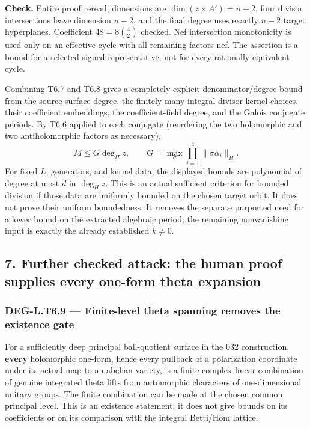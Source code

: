 \textbf{Check.} Entire proof reread; dimensions are \(\dim(z\times A')=n+2\), four divisor intersections leave dimension \(n-2\), and the final degree uses exactly \(n-2\) target hyperplanes. Coefficient \(48=8\binom42\) checked. Nef intersection monotonicity is used only on an effective cycle with all remaining factors nef. The assertion is a bound for a selected signed representative, not for every rationally equivalent cycle.

Combining T6.7 and T6.8 gives a completely explicit denominator/degree bound from the source surface degree, the finitely many integral divisor-kernel choices, their coefficient embeddings, the coefficient-field degree, and the Galois conjugate periods. By T6.6 applied to each conjugate (reordering the two holomorphic and two antiholomorphic factors as necessary), \[
M\le G\deg_H z,\qquad
G=\max_\sigma\prod_{i=1}^4\|\sigma\alpha_i\|_H.
\] For fixed \(L\), generators, and kernel data, the displayed bounds are polynomial of degree at most \(d\) in \(\deg_H z\). This is an actual sufficient criterion for bounded division if those data are uniformly bounded on the chosen target orbit. It does not prove their uniform boundedness. It removes the separate purported need for a lower bound on the extracted algebraic period; the remaining nonvanishing input is exactly the already established \(k\ne0\).

\subsection{7. Further checked attack: the human proof supplies every one-form theta expansion}\label{further-checked-attack-the-human-proof-supplies-every-one-form-theta-expansion}

\subsubsection{DEG-L.T6.9 --- Finite-level theta spanning removes the existence gate}\label{DEG-L.T6.9}

For a sufficiently deep principal ball-quotient surface in the 032 construction, \textbf{every} holomorphic one-form, hence every pullback of a polarization coordinate under its actual map to an abelian variety, is a finite complex linear combination of genuine integrated theta lifts from automorphic characters of one-dimensional unitary groups. The finite combination can be made at the chosen common principal level. This is an existence statement; it does not give bounds on its coefficients or on its comparison with the integral Betti/Hom lattice.

